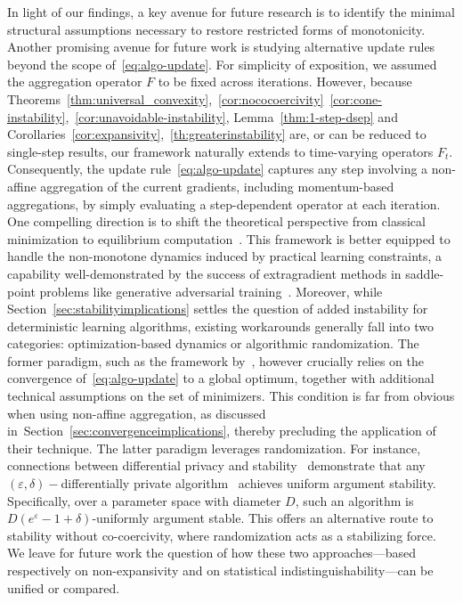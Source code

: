 \documentclass[twoside,11pt]{article}
\let\todo\relax%
\newcommand{\comm}[3][inline]{\todo[#1, size=\tiny]{#2: #3}}
\newcommand{\tbtodo}[2][inline]{\comm[color=orange,#1]{TB}{#2}}
\newcommand{\batodo}[2][inline]{\comm[color=magenta,#1]{BL}{#2}}
\newcommand{\au}[1]{\textcolor{green!80!black}{#1}}
\begin{document}
In light of our findings, a key avenue for future research is to identify the minimal structural assumptions necessary to restore restricted forms of monotonicity.
Another promising avenue for future work is studying alternative update rules beyond the scope of~\eqref{eq:algo-update}.
For simplicity of exposition, we assumed the aggregation operator $F$ to be fixed across iterations.
However, because Theorems~\ref{thm:universal_convexity},~\ref{cor:nococoercivity}~\ref{cor:cone-instability},~\ref{cor:unavoidable-instability}, Lemma~\ref{thm:1-step-dsep} and Corollaries~\ref{cor:expansivity},~\ref{th:greaterinstability} are, or can be reduced to single-step results, our framework naturally extends to time-varying operators $F_t$.
Consequently, the update rule~\eqref{eq:algo-update} captures any step involving a non-affine aggregation of the current gradients, including momentum-based aggregations, by simply evaluating a step-dependent operator at each iteration.
One compelling direction is to shift the theoretical perspective from classical minimization to equilibrium computation~\citep[variational inequality problems, cf.][]{facchinei2007finite}.
This framework is better equipped to handle the non-monotone dynamics induced by practical learning constraints, 
a capability well-demonstrated by the success of extragradient methods in saddle-point problems like generative adversarial training~\citep{gidelvariational2019,mertikopoulosoptimistic}.
Moreover, while Section~\ref{sec:stabilityimplications} settles the question of added instability for deterministic learning algorithms, existing workarounds generally fall into two categories: optimization-based dynamics or algorithmic randomization. 
The former paradigm, such as the framework by~\citet{pmlr-v80-charles18a}, however crucially relies on the convergence of~\eqref{eq:algo-update} to a global optimum, together with additional technical assumptions on the set of minimizers.
This condition is far from obvious when using non-affine aggregation, as discussed in~Section~\ref{sec:convergenceimplications}, thereby precluding the application of their technique.
The latter paradigm leverages randomization. 
For instance, connections between differential privacy and stability~\cite[Lemma 23]{wang2016privacylearning} demonstrate that any $(\varepsilon, \delta)-$differentially private algorithm~\cite[see][Definition 20]{wang2016privacylearning} achieves uniform argument stability. 
Specifically, over a parameter space with diameter $D$, such an algorithm is $D(e^\varepsilon - 1 + \delta)$-uniformly argument stable. 
This offers an alternative route to stability without co-coercivity, where randomization acts as a stabilizing force.
We leave for future work the question of how these two approaches---based respectively on non-expansivity and on statistical indistinguishability---can be unified or compared.
\end{document}
